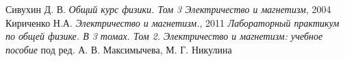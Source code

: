 \documentclass[12pt,a4paper]{article}
\begin{document}
\newpage
\begin{thebibliography}{9}
	 Сивухин Д. В. \emph{Общий курс физики. Том 3 Электричество и магнетизм}, 2004
	 Кириченко Н.А. \emph{Электричество и магнетизм.}, 2011
	 \emph{Лабораторный практикум по общей физике. В 3 томах. Том 2. Электричество и магнетизм: учебное пособие} под ред. А. В. Максимычева, М. Г. Никулина
\end{thebibliography}
\end{document}
